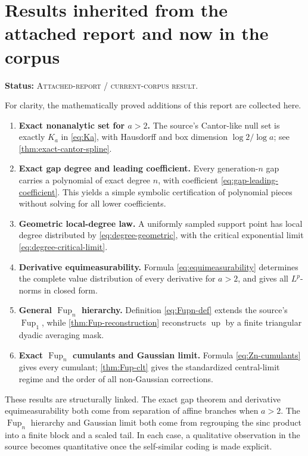\documentclass[11pt,oneside]{article}
\theoremstyle{definition}
\theoremstyle{remark}
\newcommand{\Up}{\operatorname{up}}
\newcommand{\Fup}{\operatorname{Fup}}
\newcommand{\DraftStatus}{\textcolor{DraftAmber}{\textsc{Attached-report / current-corpus result}}}
\newcommand{\status}[1]{\par\smallskip\noindent\textbf{Status:} #1.\par\smallskip}
\begin{document}
\section{Results inherited from the attached report and now in the corpus}
\label{sec:new-results}
\status{\DraftStatus}

For clarity, the mathematically proved additions of this report are collected here.

\begin{enumerate}[label=\textbf{R\arabic*.}]
  \item \textbf{Exact nonanalytic set for \(a>2\).}  The source's Cantor-like null set is exactly \(K_a\) in \eqref{eq:Ka}, with Hausdorff and box dimension \(\log2/\log a\); see \cref{thm:exact-cantor-spline}.

  \item \textbf{Exact gap degree and leading coefficient.}  Every generation-\(n\) gap carries a polynomial of exact degree \(n\), with coefficient \eqref{eq:gap-leading-coefficient}.  This yields a simple symbolic certification of polynomial pieces without solving for all lower coefficients.

  \item \textbf{Geometric local-degree law.}  A uniformly sampled support point has local degree distributed by \eqref{eq:degree-geometric}, with the critical exponential limit \eqref{eq:degree-critical-limit}.

  \item \textbf{Derivative equimeasurability.}  Formula \eqref{eq:equimeasurability} determines the complete value distribution of every derivative for \(a>2\), and gives all \(L^p\)-norms in closed form.

  \item \textbf{General \(\Fup_n\) hierarchy.}  Definition \eqref{eq:Fupn-def} extends the source's \(\Fup_1\), while \cref{thm:Fup-reconstruction} reconstructs \(\Up\) by a finite triangular dyadic averaging mask.

  \item \textbf{Exact \(\Fup_n\) cumulants and Gaussian limit.}  Formula \eqref{eq:Zn-cumulants} gives every cumulant; \cref{thm:Fup-clt} gives the standardized central-limit regime and the order of all non-Gaussian corrections.
\end{enumerate}

These results are structurally linked.  The exact gap theorem and derivative equimeasurability both come from separation of affine branches when \(a>2\).  The \(\Fup_n\) hierarchy and Gaussian limit both come from regrouping the sinc product into a finite block and a scaled tail.  In each case, a qualitative observation in the source becomes quantitative once the self-similar coding is made explicit.
\end{document}
